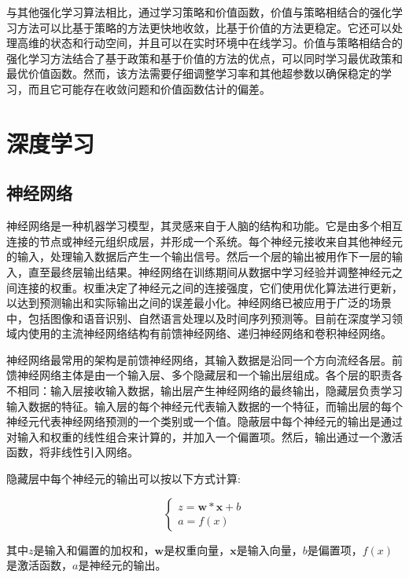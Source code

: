 与其他强化学习算法相比，通过学习策略和价值函数，价值与策略相结合的强化学习方法可以比基于策略的方法更快地收敛，比基于价值的方法更稳定。它还可以处理高维的状态和行动空间，并且可以在实时环境中在线学习。价值与策略相结合的强化学习方法结合了基于政策和基于价值的方法的优点，可以同时学习最优政策和最优价值函数。然而，该方法需要仔细调整学习率和其他超参数以确保稳定的学习，而且它可能存在收敛问题和价值函数估计的偏差。


\section{深度学习}

\subsection{神经网络}

神经网络是一种机器学习模型，其灵感来自于人脑的结构和功能。它是由多个相互连接的节点或神经元组织成层，并形成一个系统。每个神经元接收来自其他神经元的输入，处理输入数据后产生一个输出信号。然后一个层的输出被用作下一层的输入，直至最终层输出结果。神经网络在训练期间从数据中学习经验并调整神经元之间连接的权重。权重决定了神经元之间的连接强度，它们使用优化算法进行更新，以达到预测输出和实际输出之间的误差最小化。神经网络已被应用于广泛的场景中，包括图像和语音识别、自然语言处理以及时间序列预测等。目前在深度学习领域内使用的主流神经网络结构有前馈神经网络、递归神经网络和卷积神经网络。

神经网络最常用的架构是前馈神经网络，其输入数据是沿同一个方向流经各层。前馈神经网络主体是由一个输入层、多个隐藏层和一个输出层组成。各个层的职责各不相同：输入层接收输入数据，输出层产生神经网络的最终输出，隐藏层负责学习输入数据的特征。输入层的每个神经元代表输入数据的一个特征，而输出层的每个神经元代表神经网络预测的一个类别或一个值。隐蔽层中每个神经元的输出是通过对输入和权重的线性组合来计算的，并加入一个偏置项。然后，输出通过一个激活函数，将非线性引入网络。

隐藏层中每个神经元的输出可以按以下方式计算:

\begin{equation}
\label{eq:2_13}
\left\{\begin{array}{c}
z = \mathbf w *\mathbf x + b \\
a = f(x)
\end{array}\right.
\end{equation}

其中$z$是输入和偏置的加权和，$\mathbf w$是权重向量，$\mathbf x$是输入向量，$b$是偏置项，$f(x)$是激活函数，$a$是神经元的输出。

